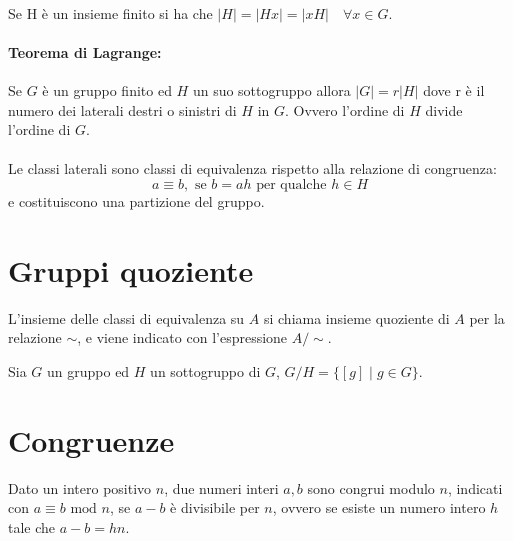 \documentclass[a4paper]{article}
\begin{document}
        \paragraph{}
        Se H \`{e} un insieme finito si ha che $|H| = |Hx| = |xH| \quad \forall x \in G$.

        \paragraph{Teorema di Lagrange:}
        Se $G$ \`{e} un gruppo finito ed $H$ un suo sottogruppo allora $|G| = r|H|$ dove r \`{e} il numero dei laterali destri o sinistri di $H$ in $G$.
        Ovvero l'ordine di $H$ divide l'ordine di $G$.

        \paragraph{}
        Le classi laterali sono classi di equivalenza rispetto alla relazione di congruenza:
        \[ a \equiv b, \mbox{ se } b = ah \mbox{ per qualche } h \in H \]
        e costituiscono una partizione del gruppo.


        \section*{Gruppi quoziente}
        L'insieme delle classi di equivalenza su $A$ si chiama insieme quoziente di $A$ per la relazione $\sim$, e viene indicato con l'espressione $A / \sim$.

        Sia $G$ un gruppo ed $H$ un sottogruppo di $G$, $ G / H = \{ [g] \mid g \in G \}$.


        \section*{Congruenze}
        Dato un intero positivo $n$, due numeri interi $a, b$ sono congrui modulo $n$, indicati con $a \equiv b \mbox{ mod } n$, se $a - b$ \`{e} divisibile per $n$, ovvero se esiste un numero intero $h$ tale che $a - b = hn$.
\end{document}
